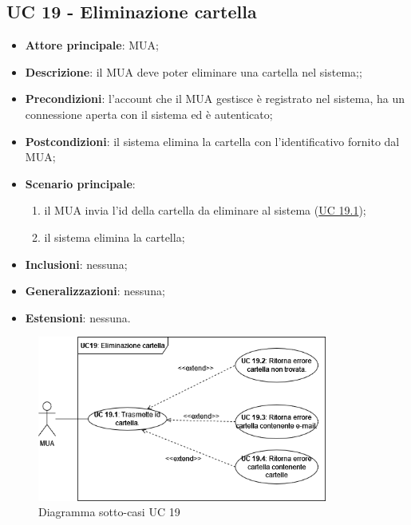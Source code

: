 \subsection{UC 19 - Eliminazione cartella} \label{sec:UC19}
    \begin{itemize}
        \item \textbf{Attore principale}: MUA;
        \item \textbf{Descrizione}: il MUA deve poter eliminare una cartella nel sistema;;
        \item \textbf{Precondizioni}: l’account che il MUA gestisce è registrato nel sistema, ha un connessione aperta con il sistema ed è autenticato;
        \item \textbf{Postcondizioni}: il sistema elimina la cartella con l'identificativo fornito dal MUA;
        \item \textbf{Scenario principale}:
            \begin{enumerate}
                \item il MUA invia l'id della cartella da eliminare al sistema (\hyperref[sec:UC19.1]{UC 19.1});
                \item il sistema elimina la cartella;
            \end{enumerate}
        \item \textbf{Inclusioni}: nessuna;
        \item \textbf{Generalizzazioni}: nessuna;
        \item \textbf{Estensioni}: nessuna.
    \end{itemize}

\begin{figure}[h]
    \includegraphics[width=0.85\textwidth]{sections/uc_imgs/UC19.png}
    \centering
    \caption{Diagramma sotto-casi UC 19}
\end{figure}

